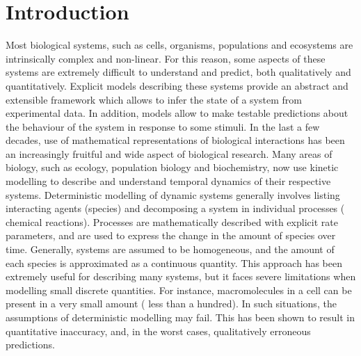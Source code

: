 \section{Introduction} \label{intro}

Most biological systems, such as cells, organisms, populations and ecosystems are intrinsically complex and non-linear.
For this reason, some aspects of these systems are extremely difficult to understand and predict, both qualitatively and quantitatively\cite{klipp_systems_2013}.
Explicit models describing these systems provide an abstract and extensible framework which allows to infer the state of a system from experimental data.
In addition, models allow to make testable predictions about the behaviour of the system in response to some stimuli.
In the last a few decades, use of mathematical representations of biological interactions has been an increasingly fruitful and wide aspect of biological research.
Many areas of biology, such as ecology, population biology and biochemistry, now
use kinetic modelling to describe and understand temporal dynamics of their respective systems.
Deterministic modelling of dynamic systems generally involves listing
interacting agents (species) and decomposing a system in individual processes (\eg{} chemical reactions).
Processes are mathematically described with explicit rate parameters, and  are used to express the change in the amount of species over time.
Generally, systems are assumed to be homogeneous, and the amount of each species is approximated as a continuous quantity.
This approach has been extremely useful for describing many systems, but it faces severe limitations when modelling small discrete quantities.
For instance, macromolecules in a cell can be present in a very small amount (\eg{} less than a hundred)\cite{ghaemmaghami_global_2003}.
In such situations, the assumptions of deterministic modelling may fail.
This has been shown to result in quantitative inaccuracy\cite{ale_general_2013}, and, in the worst cases, qualitatively erroneous predictions.


